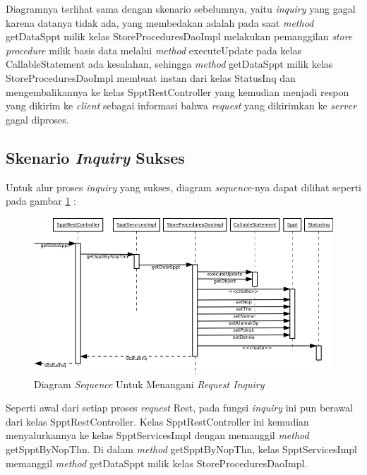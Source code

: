Diagramnya terlihat sama dengan skenario sebelumnya, yaitu \textit{inquiry} yang gagal karena datanya tidak ada, yang membedakan adalah pada saat \textit{method} getDataSppt milik kelas StoreProceduresDaoImpl melakukan pemanggilan \textit{store procedure} milik basis data melalui \textit{method} executeUpdate pada kelas CallableStatement ada kesalahan, sehingga \textit{method} getDataSppt milik kelas StoreProceduresDaoImpl membuat instan dari kelas StatusInq dan mengembalikannya ke kelas SpptRestController yang kemudian menjadi respon yang dikirim ke \textit{client} sebagai informasi bahwa \textit{request} yang dikirimkan ke \textit{server} gagal diproses.

\subsection{Skenario \textit{Inquiry} Sukses}

Untuk alur proses \textit{inquiry} yang sukses, diagram \textit{sequence}-nya dapat dilihat seperti pada gambar \ref{fig:uml-seq-inq} :
  
  \begin{figure}[H]
    \centering
    \includegraphics[width=1\textwidth]{./resources/uml/uml-seq-inquiry}
    \caption{Diagram \textit{Sequence} Untuk Menangani \textit{Request Inquiry}}
    \label{fig:uml-seq-inq}
  \end{figure}
  
  Seperti awal dari setiap proses \textit{request} Rest, pada fungsi \textit{inquiry} ini pun berawal dari kelas SpptRestController. Kelas SpptRestController ini kemudian menyalurkannya ke kelas SpptServicesImpl dengan memanggil \textit{method} getSpptByNopThn. Di dalam \textit{method} getSpptByNopThn, kelas SpptServicesImpl memanggil \textit{method} getDataSppt milik kelas StoreProceduresDaoImpl.
  
